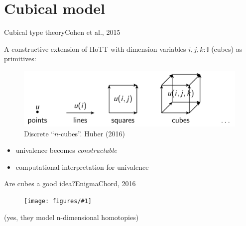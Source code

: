 \documentclass[english]{beamer}
\newcommand{\fig}[2]{
    \begin{figure}\begin{center}\texttt{[image: figures/\#1]}\caption{#2\label{#1}}\end{center}
    \end{figure}}
\begin{document}
\section{Cubical model}

\begin{frame}{Cubical type theory}{Cohen et al., 2015}

A constructive extension of HoTT with dimension variables $i,j,k : \mathbb{I}$ (cubes) as primitives:

\begin{figure}[h!]
    \includegraphics[width=.7\textwidth]{figures/cubes.png}
    \caption{Discrete ``$n$-cubes''. Huber (2016)}
\end{figure}


\begin{itemize}
\item univalence becomes \emph{constructable}
\item computational interpretation for univalence 
\end{itemize}

\end{frame}


\begin{frame}{Are cubes a good idea?}{EnigmaChord, 2016}

\fig{cube-joke.jpg}{}

\pause

(yes, they model n-dimensional homotopies)

\end{frame}
\end{document}
